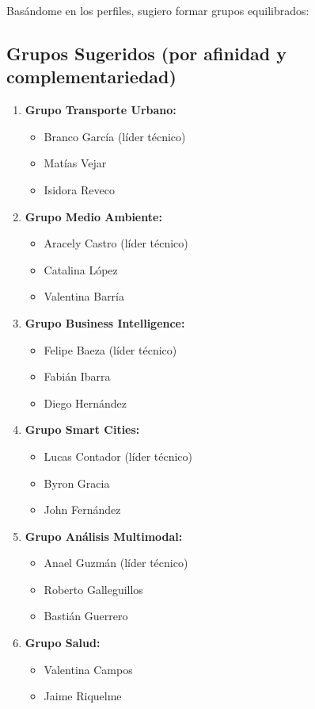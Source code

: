 \documentclass[11pt,a4paper]{article}
\begin{document}
Basándome en los perfiles, sugiero formar grupos equilibrados:

\subsection{Grupos Sugeridos (por afinidad y complementariedad)}

\begin{enumerate}
    \item \textbf{Grupo Transporte Urbano:}
    \begin{itemize}
        \item Branco García (líder técnico)
        \item Matías Vejar
        \item Isidora Reveco
    \end{itemize}
    
    \item \textbf{Grupo Medio Ambiente:}
    \begin{itemize}
        \item Aracely Castro (líder técnico)
        \item Catalina López
        \item Valentina Barría
    \end{itemize}
    
    \item \textbf{Grupo Business Intelligence:}
    \begin{itemize}
        \item Felipe Baeza (líder técnico)
        \item Fabián Ibarra
        \item Diego Hernández
    \end{itemize}
    
    \item \textbf{Grupo Smart Cities:}
    \begin{itemize}
        \item Lucas Contador (líder técnico)
        \item Byron Gracia
        \item John Fernández
    \end{itemize}
    
    \item \textbf{Grupo Análisis Multimodal:}
    \begin{itemize}
        \item Anael Guzmán (líder técnico)
        \item Roberto Galleguillos
        \item Bastián Guerrero
    \end{itemize}
    
    \item \textbf{Grupo Salud:}
    \begin{itemize}
        \item Valentina Campos
        \item Jaime Riquelme
    \end{itemize}
\end{enumerate}
\end{document}
